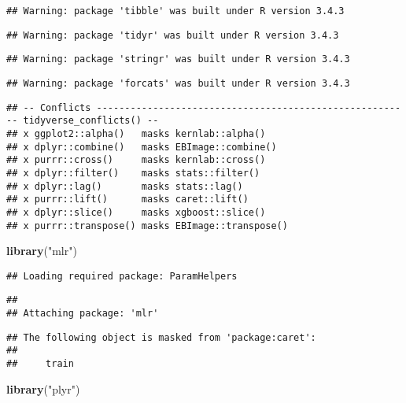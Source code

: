 \documentclass[]{article}
\newenvironment{Shaded}{\begin{snugshade}}{\end{snugshade}}
\newcommand{\KeywordTok}[1]{\textcolor[rgb]{0.13,0.29,0.53}{\textbf{#1}}}
\newcommand{\StringTok}[1]{\textcolor[rgb]{0.31,0.60,0.02}{#1}}
\newcommand{\NormalTok}[1]{#1}
\begin{document}
\begin{verbatim}
## Warning: package 'tibble' was built under R version 3.4.3
\end{verbatim}

\begin{verbatim}
## Warning: package 'tidyr' was built under R version 3.4.3
\end{verbatim}

\begin{verbatim}
## Warning: package 'stringr' was built under R version 3.4.3
\end{verbatim}

\begin{verbatim}
## Warning: package 'forcats' was built under R version 3.4.3
\end{verbatim}

\begin{verbatim}
## -- Conflicts -------------------------------------------------------- tidyverse_conflicts() --
## x ggplot2::alpha()   masks kernlab::alpha()
## x dplyr::combine()   masks EBImage::combine()
## x purrr::cross()     masks kernlab::cross()
## x dplyr::filter()    masks stats::filter()
## x dplyr::lag()       masks stats::lag()
## x purrr::lift()      masks caret::lift()
## x dplyr::slice()     masks xgboost::slice()
## x purrr::transpose() masks EBImage::transpose()
\end{verbatim}

\begin{Shaded}
\begin{Highlighting}[]
\KeywordTok{library}\NormalTok{(}\StringTok{"mlr"}\NormalTok{)}
\end{Highlighting}
\end{Shaded}

\begin{verbatim}
## Loading required package: ParamHelpers
\end{verbatim}

\begin{verbatim}
## 
## Attaching package: 'mlr'
\end{verbatim}

\begin{verbatim}
## The following object is masked from 'package:caret':
## 
##     train
\end{verbatim}

\begin{Shaded}
\begin{Highlighting}[]
\KeywordTok{library}\NormalTok{(}\StringTok{"plyr"}\NormalTok{)}
\end{Highlighting}
\end{Shaded}
\end{document}
